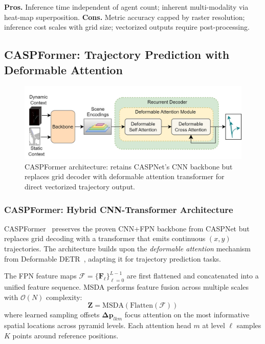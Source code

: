 \begin{description}[leftmargin=1em,itemsep=2pt]
\textbf{Pros.} Inference time independent of agent count; inherent multi-modality via heat-map superposition.
\textbf{Cons.} Metric accuracy capped by raster resolution; inference cost scales with grid size; vectorized outputs require post-processing.

\subsection{CASPFormer: Trajectory Prediction with Deformable Attention}
\label{ssec:caspformer}

\begin{figure}[ht]
  \centering
  \includegraphics[width=\linewidth]{figures/caspformer-overall-arch.jpg}
  \caption{CASPFormer architecture: retains CASPNet's CNN backbone but replaces grid decoder with deformable attention transformer for direct vectorized trajectory output.}
  \label{fig:caspformer_overall}
\end{figure}

\subsubsection*{CASPFormer: Hybrid CNN-Transformer Architecture}

CASPFormer~\cite{caspformerYadav2024} preserves the proven CNN+FPN backbone from CASPNet but replaces grid decoding with a transformer that emits continuous \((x,y)\) trajectories. The architecture builds upon the \emph{deformable attention} mechanism from Deformable DETR~\cite{zhu2021deformable}, adapting it for trajectory prediction tasks.

\begin{description}[leftmargin=1em,itemsep=2pt]
\item[Multi-Scale Deformable Self-Attention (MSDA).] The FPN feature maps \(\boldsymbol{\mathcal{F}} = \{\mathbf{F}_\ell\}_{\ell=0}^{L-1}\) are first flattened and concatenated into a unified feature sequence. MSDA performs feature fusion across multiple scales with \(\mathcal{O}(N)\) complexity:
\begin{equation}
\label{eq:msda_fusion}
\mathbf{Z} = \text{MSDA}(\text{Flatten}(\boldsymbol{\mathcal{F}}))
\end{equation}
where learned sampling offsets \(\boldsymbol{\Delta p}_{lkm}\) focus attention on the most informative spatial locations across pyramid levels. Each attention head \(m\) at level \(\ell\) samples \(K\) points around reference positions.


\end{description}
\end{description}
